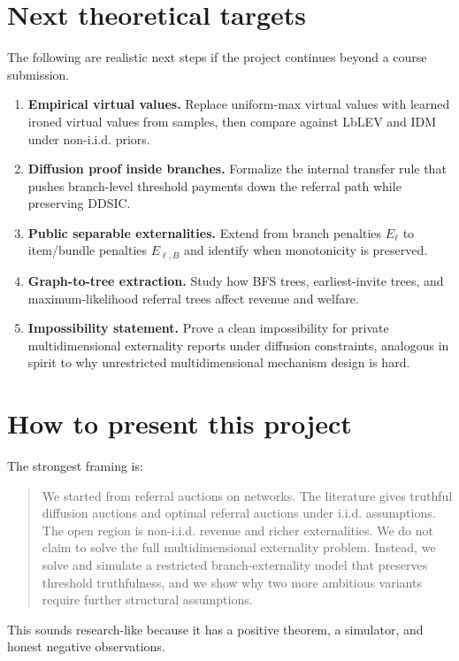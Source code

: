 \documentclass[11pt]{article}
\begin{document}
\section{Next theoretical targets}

The following are realistic next steps if the project continues beyond a course submission.

\begin{enumerate}[leftmargin=*]
\item \textbf{Empirical virtual values.} Replace uniform-max virtual values with learned ironed virtual values from samples, then compare against LbLEV and IDM under non-i.i.d. priors.
\item \textbf{Diffusion proof inside branches.} Formalize the internal transfer rule that pushes branch-level threshold payments down the referral path while preserving DDSIC.
\item \textbf{Public separable externalities.} Extend from branch penalties $E_\ell$ to item/bundle penalties $E_{\ell,B}$ and identify when monotonicity is preserved.
\item \textbf{Graph-to-tree extraction.} Study how BFS trees, earliest-invite trees, and maximum-likelihood referral trees affect revenue and welfare.
\item \textbf{Impossibility statement.} Prove a clean impossibility for private multidimensional externality reports under diffusion constraints, analogous in spirit to why unrestricted multidimensional mechanism design is hard.
\end{enumerate}

\section{How to present this project}

The strongest framing is:

\begin{quote}
We started from referral auctions on networks. The literature gives truthful diffusion auctions and optimal referral auctions under i.i.d. assumptions. The open region is non-i.i.d. revenue and richer externalities. We do not claim to solve the full multidimensional externality problem. Instead, we solve and simulate a restricted branch-externality model that preserves threshold truthfulness, and we show why two more ambitious variants require further structural assumptions.
\end{quote}

This sounds research-like because it has a positive theorem, a simulator, and honest negative observations.
\end{document}
